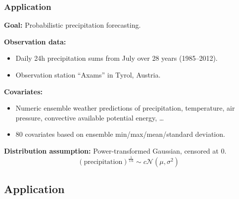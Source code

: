 \documentclass[11pt,t,usepdftitle=false,aspectratio=169]{beamer}
\begin{document}
\begin{frame}[fragile]
\frametitle{Application}

\vspace{-0.75em}

\textbf{Goal:} Probabilistic precipitation forecasting.

\bigskip
\pause

\textbf{Observation data:}
\begin{itemize}
\item Daily 24h precipitation sums from July over 28 years (1985--2012).
\item Observation station ``Axams'' in Tyrol, Austria.
\end{itemize}

\bigskip
\pause

\textbf{Covariates:} 
\begin{itemize}
\item Numeric ensemble weather predictions of precipitation, temperature, air pressure, 
  convective available potential energy, \dots
\item 80 covariates based on ensemble min/max/mean/standard deviation.
\end{itemize}

\bigskip
\pause

\textbf{Distribution assumption:} Power-transformed Gaussian, censored at 0.
\[ (\text{precipitation})^\frac{1}{1.6} \sim \textit{c}\mathcal{N}(\mu,\sigma^2) \]

\end{frame}


\subsection{Application}

\end{document}
